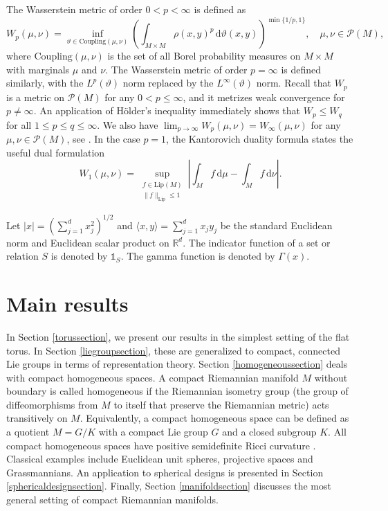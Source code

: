 \documentclass[11pt,a4paper]{article}
\theoremstyle{definition}
\begin{document}
The Wasserstein metric of order $0<p<\infty$ is defined as
\[ W_p (\mu, \nu) = \inf_{\vartheta \in \textrm{Coupling}(\mu, \nu)} \left( \int_{M \times M} \rho (x,y)^p \, \mathrm{d} \vartheta (x,y) \right)^{\min \{ 1/p, 1 \}}, \quad \mu, \nu \in \mathcal{P}(M), \]
where $\textrm{Coupling}(\mu, \nu)$ is the set of all Borel probability measures on $M \times M$ with marginals $\mu$ and $\nu$. The Wasserstein metric of order $p=\infty$ is defined similarly, with the $L^p(\vartheta)$ norm replaced by the $L^{\infty}(\vartheta)$ norm. Recall that $W_p$ is a metric on $\mathcal{P}(M)$ for any $0<p\le \infty$, and it metrizes weak convergence for $p \neq \infty$. An application of H\"older's inequality immediately shows that $W_p \le W_q$ for all $1 \le p \le q \le \infty$. We also have $\lim_{p \to \infty} W_p (\mu, \nu) = W_{\infty} (\mu, \nu)$ for any $\mu, \nu \in \mathcal{P}(M)$, see \cite{GS}. In the case $p=1$, the Kantorovich duality formula \cite[p.\ 107]{VI} states the useful dual formulation
\begin{equation}\label{kantorovichduality}
W_1 (\mu, \nu) = \sup_{\substack{f \in \mathrm{Lip}(M) \\ \| f \|_{\mathrm{Lip}} \le 1}} \left| \int_M f \, \mathrm{d} \mu - \int_M f \, \mathrm{d}\nu \right| .
\end{equation}

Let $|x|=(\sum_{j=1}^d x_j^2)^{1/2}$ and $\langle x,y \rangle=\sum_{j=1}^d x_j y_j$ be the standard Euclidean norm and Euclidean scalar product on $\mathbb{R}^d$. The indicator function of a set or relation $S$ is denoted by $\mathds{1}_S$. The gamma function is denoted by $\Gamma(x)$.

\section{Main results}\label{resultssection}

In Section \ref{torussection}, we present our results in the simplest setting of the flat torus. In Section \ref{liegroupsection}, these are generalized to compact, connected Lie groups in terms of representation theory. Section \ref{homogeneoussection} deals with compact homogeneous spaces. A compact Riemannian manifold $M$ without boundary is called homogeneous if the Riemannian isometry group (the group of diffeomorphisms from $M$ to itself that preserve the Riemannian metric) acts transitively on $M$. Equivalently, a compact homogeneous space can be defined as a quotient $M=G/K$ with a compact Lie group $G$ and a closed subgroup $K$. All compact homogeneous spaces have positive semidefinite Ricci curvature \cite{SA}. Classical examples include Euclidean unit spheres, projective spaces and Grassmannians. An application to spherical designs is presented in Section \ref{sphericaldesignsection}. Finally, Section \ref{manifoldsection} discusses the most general setting of compact Riemannian manifolds.
\end{document}
